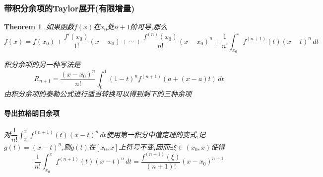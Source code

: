 \documentclass[11pt,hyperref,a4paper,UTF8]{ctexart}
\newtheorem{theorem}{Theorem}[subsection]
\newenvironment{cproof}{%
\heiti{证明}\kaishu
}{%
  \hfill $\square$
  \par\bigskip
}
\begin{document}
\begin{CJK}{UTF8}{gkai}

\subsubsection{带积分余项的Taylor展开(有限增量)}
\begin{theorem}
如果函数$f(x)$在$x_0$处$n + 1$阶可导,那么
\[f(x) = f(x_0) + \dfrac{f'(x_0)}{1!}(x - x_0) +\cdots + \dfrac{f^{(n)}(x_0)}{n!}(x - x_0)^n + \dfrac{1}{n!}\int_{x_0}^{x} f^{(n + 1)}(t) (x - t)^n\,dt\]

积分余项的另一种写法是
\[R_{n+1} = \frac{(x - x_0)^n}{n!} \int_{0}^{1}(1 - t)^n f^{(n + 1)}(a + (x - a)t)\, dt\]
由积分余项的泰勒公式进行适当转换可以得到剩下的三种余项
\paragraph{导出拉格朗日余项\\}

对$ \dfrac{1}{n!}\int_{x_0}^{x} f^{(n + 1)}(t) (x - t)^n\,dt$使用第一积分中值定理的变式,记$g(t ) = (x - t)^n$,则$g(t)$在$[x_0,x]$上符号不变,因而$\exists \xi \in (x_0,x)$使得
\[ \dfrac{1}{n!}\int_{x_0}^{x} f^{(n + 1)}(t) (x - t)^n\,dt = \dfrac{f^{(n + 1)}(\xi)}{(n + 1)!}(x - x_0)^{n + 1}\]


\end{theorem}
\end{CJK}
\end{document}
